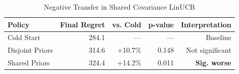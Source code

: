 \begin{table}[t]
\centering
\caption{Negative Transfer in Shared Covariance LinUCB}
\label{tab:negative_transfer}
\begin{tabular}{lrrrr}
\toprule
\textbf{Policy} & \textbf{Final Regret} & \textbf{vs. Cold} & \textbf{p-value} & \textbf{Interpretation} \\
\midrule
Cold Start & 284.1 & --- & --- & Baseline \\
Disjoint Priors & 314.6 & +10.7\% & 0.148 & Not significant \\
Shared Priors & 324.4 & +14.2\% & 0.011 & \textbf{Sig. worse} \\
\bottomrule
\end{tabular}
\end{table}
